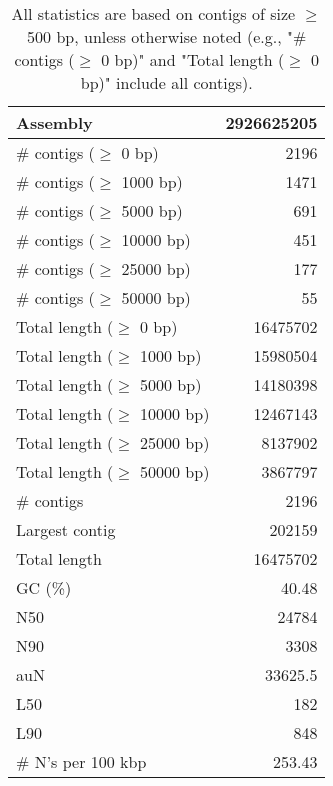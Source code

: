 \documentclass[12pt,a4paper]{article}
\begin{document}
\begin{table}[ht]
\begin{center}
\caption{All statistics are based on contigs of size $\geq$ 500 bp, unless otherwise noted (e.g., "\# contigs ($\geq$ 0 bp)" and "Total length ($\geq$ 0 bp)" include all contigs).}
\begin{tabular}{|l*{1}{|r}|}
\hline
Assembly & 2926625205 \\ \hline
\# contigs ($\geq$ 0 bp) & 2196 \\ \hline
\# contigs ($\geq$ 1000 bp) & 1471 \\ \hline
\# contigs ($\geq$ 5000 bp) & 691 \\ \hline
\# contigs ($\geq$ 10000 bp) & 451 \\ \hline
\# contigs ($\geq$ 25000 bp) & 177 \\ \hline
\# contigs ($\geq$ 50000 bp) & 55 \\ \hline
Total length ($\geq$ 0 bp) & 16475702 \\ \hline
Total length ($\geq$ 1000 bp) & 15980504 \\ \hline
Total length ($\geq$ 5000 bp) & 14180398 \\ \hline
Total length ($\geq$ 10000 bp) & 12467143 \\ \hline
Total length ($\geq$ 25000 bp) & 8137902 \\ \hline
Total length ($\geq$ 50000 bp) & 3867797 \\ \hline
\# contigs & 2196 \\ \hline
Largest contig & 202159 \\ \hline
Total length & 16475702 \\ \hline
GC (\%) & 40.48 \\ \hline
N50 & 24784 \\ \hline
N90 & 3308 \\ \hline
auN & 33625.5 \\ \hline
L50 & 182 \\ \hline
L90 & 848 \\ \hline
\# N's per 100 kbp & 253.43 \\ \hline
\end{tabular}
\end{center}
\end{table}
\end{document}
